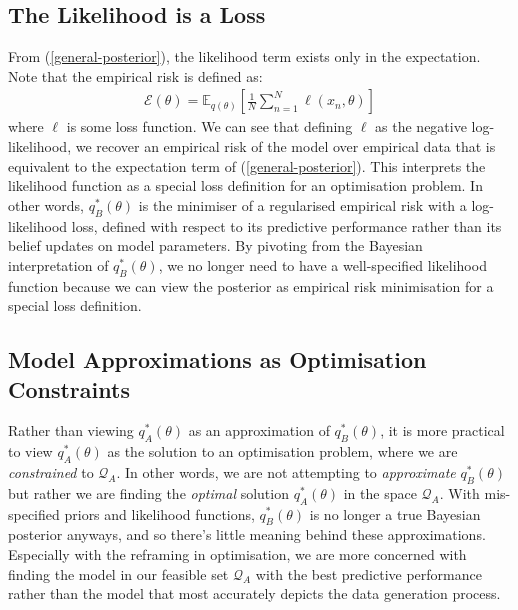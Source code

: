\documentclass[twoside,11pt]{article}
\newcommand{\jk}[1]{{\color{blue} [JK: #1]}}
\begin{document}
\subsection{The Likelihood is a Loss}
From (\ref{general-posterior}), the likelihood term exists only in the expectation. Note that the empirical risk is defined as:
\begin{align}
\mathcal{E}(\theta) = \mathbb{E}_{q(\theta)}\left[\frac{1}{N}\sum_{n=1}^N \ell\left(x_n, \theta\right)\right]
\label{empirical-risk}
\end{align}
where $\ell$ is some loss function. We can see that defining $\ell$ as the negative log-likelihood, we recover an empirical risk of the model over empirical data that is equivalent to the expectation term of (\ref{general-posterior}). This interprets the likelihood function as a special loss definition for an optimisation problem. In other words, $q_B^*(\theta)$ is the minimiser of a regularised empirical risk with a log-likelihood loss, defined with respect to its predictive performance rather than its belief updates on model parameters. By pivoting from the Bayesian interpretation of $q_B^*(\theta)$, we no longer need to have a well-specified likelihood function because we can view the posterior as empirical risk minimisation for a special loss definition.

\subsection{Model Approximations as Optimisation Constraints}
Rather than viewing $q_A^*(\theta)$ as an approximation of $q_B^*(\theta)$, it is more practical to view $q_A^*(\theta)$ as the solution to an optimisation problem, where we are \textit{constrained} to $\mathcal{Q}_{A}$. In other words, we are not attempting to \textit{approximate} $q_B^*(\theta)$ but rather we are finding the \textit{optimal} solution $q_A^*(\theta)$ in the space $\mathcal{Q}_{A}$. With mis-specified priors and likelihood functions, $q_B^*(\theta)$  is no longer a true Bayesian posterior anyways, and so there's little meaning behind these approximations. Especially with the reframing in optimisation, we are more concerned with finding the model in our feasible set $\mathcal{Q}_{A}$ with the best predictive performance rather than the model that most accurately depicts the data generation process.
\end{document}
